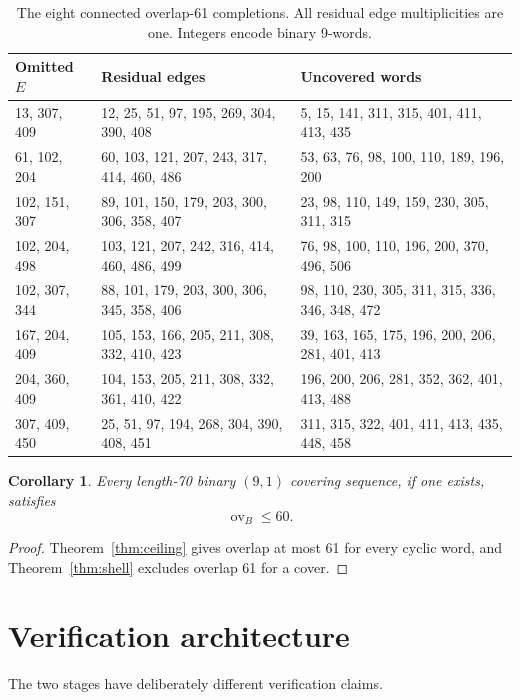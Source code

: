 \documentclass[11pt]{article}
\newtheorem{corollary}[theorem]{Corollary}
\theoremstyle{definition}
\theoremstyle{remark}
\newcommand{\ov}{\operatorname{ov}}
\begin{document}
\begin{table}[p]
\centering
\small
\caption{The eight connected overlap-61 completions.  All residual edge
multiplicities are one.  Integers encode binary 9-words.}
\label{tab:completions}
\begin{tabular}{@{}p{}p{}
  p{}@{}}
\toprule
Omitted $E$ & Residual edges & Uncovered words\\
\midrule
13, 307, 409 &
12, 25, 51, 97, 195, 269, 304, 390, 408 &
5, 15, 141, 311, 315, 401, 411, 413, 435\\
61, 102, 204 &
60, 103, 121, 207, 243, 317, 414, 460, 486 &
53, 63, 76, 98, 100, 110, 189, 196, 200\\
102, 151, 307 &
89, 101, 150, 179, 203, 300, 306, 358, 407 &
23, 98, 110, 149, 159, 230, 305, 311, 315\\
102, 204, 498 &
103, 121, 207, 242, 316, 414, 460, 486, 499 &
76, 98, 100, 110, 196, 200, 370, 496, 506\\
102, 307, 344 &
88, 101, 179, 203, 300, 306, 345, 358, 406 &
98, 110, 230, 305, 311, 315, 336, 346, 348, 472\\
167, 204, 409 &
105, 153, 166, 205, 211, 308, 332, 410, 423 &
39, 163, 165, 175, 196, 200, 206, 281, 401, 413\\
204, 360, 409 &
104, 153, 205, 211, 308, 332, 361, 410, 422 &
196, 200, 206, 281, 352, 362, 401, 413, 488\\
307, 409, 450 &
25, 51, 97, 194, 268, 304, 390, 408, 451 &
311, 315, 322, 401, 411, 413, 435, 448, 458\\
\bottomrule
\end{tabular}
\end{table}

\begin{corollary}
\label{cor:cover}
Every length-70 binary $(9,1)$ covering sequence, if one exists,
satisfies
\[
  \ov_B\leq 60.
\]
\end{corollary}

\begin{proof}
Theorem~\ref{thm:ceiling} gives overlap at most 61 for every cyclic word,
and Theorem~\ref{thm:shell} excludes overlap 61 for a cover.
\end{proof}

\section{Verification architecture}

The two stages have deliberately different verification claims.
\end{document}
